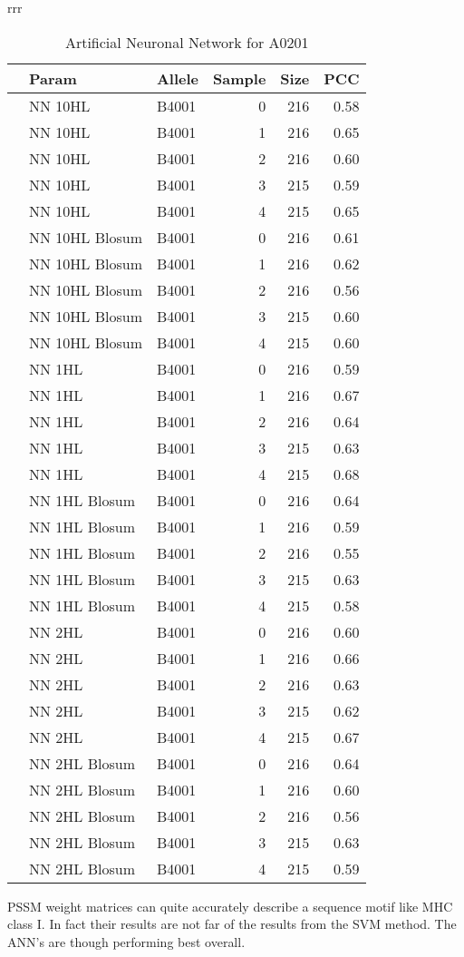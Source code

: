 \begin{table*}[h]
\begin{center}
\begin{tabular}{rrr}
\begin{tabular}{rllrrr}
  \hline
 & Param & Allele & Sample & Size & PCC \\ 
  \hline
   & NN 10HL & B4001 &   0 & 216 & 0.58 \\ 
   & NN 10HL & B4001 &   1 & 216 & 0.65 \\ 
   & NN 10HL & B4001 &   2 & 216 & 0.60 \\ 
   & NN 10HL & B4001 &   3 & 215 & 0.59 \\ 
   & NN 10HL & B4001 &   4 & 215 & 0.65 \\ 
\hline
   & NN 10HL Blosum & B4001 &   0 & 216 & 0.61 \\ 
   & NN 10HL Blosum & B4001 &   1 & 216 & 0.62 \\ 
   & NN 10HL Blosum & B4001 &   2 & 216 & 0.56 \\ 
   & NN 10HL Blosum & B4001 &   3 & 215 & 0.60 \\ 
   & NN 10HL Blosum & B4001 &   4 & 215 & 0.60 \\ 
\hline
   & NN 1HL & B4001 &   0 & 216 & 0.59 \\ 
   & NN 1HL & B4001 &   1 & 216 & 0.67 \\ 
   & NN 1HL & B4001 &   2 & 216 & 0.64 \\ 
   & NN 1HL & B4001 &   3 & 215 & 0.63 \\ 
   & NN 1HL & B4001 &   4 & 215 & 0.68 \\ 
\hline
   & NN 1HL Blosum & B4001 &   0 & 216 & 0.64 \\ 
   & NN 1HL Blosum & B4001 &   1 & 216 & 0.59 \\ 
   & NN 1HL Blosum & B4001 &   2 & 216 & 0.55 \\ 
   & NN 1HL Blosum & B4001 &   3 & 215 & 0.63 \\ 
   & NN 1HL Blosum & B4001 &   4 & 215 & 0.58 \\ 
\hline
   & NN 2HL & B4001 &   0 & 216 & 0.60 \\ 
   & NN 2HL & B4001 &   1 & 216 & 0.66 \\ 
   & NN 2HL & B4001 &   2 & 216 & 0.63 \\ 
   & NN 2HL & B4001 &   3 & 215 & 0.62 \\ 
   & NN 2HL & B4001 &   4 & 215 & 0.67 \\ 
\hline
   & NN 2HL Blosum & B4001 &   0 & 216 & 0.64 \\ 
   & NN 2HL Blosum & B4001 &   1 & 216 & 0.60 \\ 
   & NN 2HL Blosum & B4001 &   2 & 216 & 0.56 \\ 
   & NN 2HL Blosum & B4001 &   3 & 215 & 0.63 \\ 
   & NN 2HL Blosum & B4001 &   4 & 215 & 0.59 \\ 
   \hline
\end{tabular}
\end{tabular}
\end{center}

\caption{Artificial Neuronal Network for A0201}\label{tab:nn1}

\end{table*}

PSSM weight matrices can quite accurately describe a sequence motif like MHC class I. In fact their results are not far of the results from the SVM method.
The ANN's are though performing best overall.


